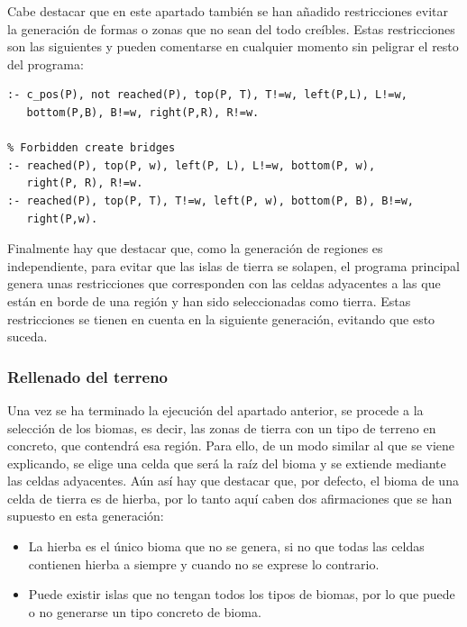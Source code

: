 \hspace{1em}

Cabe destacar que en este apartado también se han añadido restricciones evitar la generación de formas o zonas que no sean del todo creíbles. Estas restricciones son las siguientes y pueden comentarse en cualquier momento sin peligrar el resto del programa: \\

\begin{lstlisting}[label=lst:crestriccions]
% Forbidden create lakes with 1 cell
:- c_pos(P), not reached(P), top(P, T), T!=w, left(P,L), L!=w,
   bottom(P,B), B!=w, right(P,R), R!=w.

% Forbidden create bridges
:- reached(P), top(P, w), left(P, L), L!=w, bottom(P, w),
   right(P, R), R!=w.
:- reached(P), top(P, T), T!=w, left(P, w), bottom(P, B), B!=w,
   right(P,w).
\end{lstlisting}

\hspace{1em}

Finalmente hay que destacar que, como la generación de regiones es independiente, para evitar que las islas de tierra se solapen, el programa principal genera unas restricciones que corresponden con las celdas adyacentes a las que están en borde de una región y han sido seleccionadas como tierra. Estas restricciones se tienen en cuenta en la siguiente generación, evitando que esto suceda.

\subsubsection{Rellenado del terreno}

Una vez se ha terminado la ejecución del apartado anterior, se procede a la selección de los biomas, es decir, las zonas de tierra con un tipo de terreno en concreto, que contendrá esa región. Para ello, de un modo similar al que se viene explicando, se elige una celda que será la raíz del bioma y se extiende mediante las celdas adyacentes. Aún así hay que destacar que, por defecto, el bioma de una celda de tierra es de hierba, por lo tanto aquí caben dos afirmaciones que se han supuesto en esta generación:

\begin{itemize}
	\item La hierba es el único bioma que no se genera, si no que todas las celdas contienen hierba a siempre y cuando no se exprese lo contrario.
	\item Puede existir islas que no tengan todos los tipos de biomas, por lo que puede o no generarse un tipo concreto de bioma.
\end{itemize}

